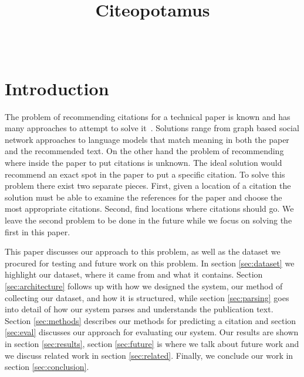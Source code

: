 \documentclass[10pt, conference, compsocconf]{IEEEtran}
\begin{document}
\title{Citeopotamus}


\author{
\\
}

\maketitle

\thispagestyle{empty}
\pagestyle{empty}

\section{Introduction}\label{sec:introduction}
The problem of recommending citations for a technical paper is known and has
many approaches to attempt to solve it~\cite{cite1, cite2, cite3, cite4, cite5,
cite6, cite7, cite8}. Solutions range from graph based social network
approaches to language models that match meaning in both the paper and the
recommended text. On the other hand the problem of recommending where inside the paper to put
citations is unknown. The ideal solution would recommend an exact spot in the
paper to put a specific citation. To solve this problem there exist two
separate pieces. First, given a location of a citation the solution must be
able to examine the references for the paper and choose the most appropriate
citations. Second, find locations where citations should go. We leave the
second problem to be done in the future while we focus on solving the first in
this paper.

This paper discusses our approach to this problem, as well as the dataset we
procured for testing and future work on this problem.
In section \ref{sec:dataset} we highlight our dataset,
where it came from and what it contains. Section \ref{sec:architecture} follows
up with how we designed the system, our method of collecting our dataset, and
how it is structured, while section \ref{sec:parsing} goes into detail of how
our system parses and understands the publication text. Section
\ref{sec:methods} describes our methods for predicting a citation and section
\ref{sec:eval} discusses our approach for evaluating our system. Our results
are shown in section \ref{sec:results}, section \ref{sec:future} is where we
talk about future work and we discuss related work in section
\ref{sec:related}. Finally, we conclude our work in section
\ref{sec:conclusion}.
\end{document}
